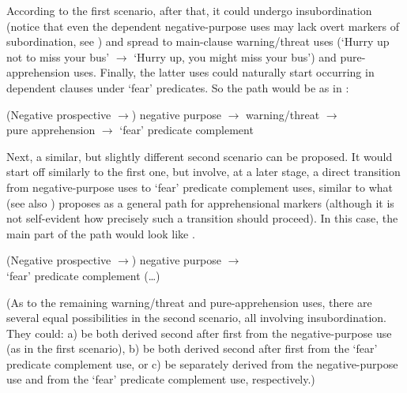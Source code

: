 \documentclass[output=paper,colorlinks,citecolor=brown]{langscibook}
\begin{document}
According to the first scenario, after that, it could undergo insubordination (notice that even the dependent negative-purpose uses may lack overt markers of subordination, see ) and spread to main-clause warning\slash threat uses (`Hurry up not to miss your bus' $\rightarrow$ `Hurry up, you might miss your bus') and pure\hyp apprehension uses. Finally, the latter uses could naturally start occurring in dependent clauses under `fear' predicates. So the path would be as in :

\ea\label{path1} \textnormal{(Negative prospective $\rightarrow$) negative purpose $\rightarrow$ warning\slash threat $\rightarrow$  \\
pure apprehension $\rightarrow$ `fear' predicate complement}
\z

 Next, a similar, but slightly different second scenario can be proposed. It would start off similarly to the first one, but involve, at a later stage, a direct transition from negative-purpose uses to `fear' predicate complement uses, similar to what \citet[319]{lichtenberk1995} (see also \cite[186--187]{Schmidtke-Bode2009}) proposes as a general path for apprehensional markers (although it is not self-evident how precisely such a transition should proceed). In this case, the main part of the path would look like .

\ea\label{path2} \textnormal{(Negative prospective $\rightarrow$) negative purpose $\rightarrow$ \\
`fear' predicate complement (\dots)}
\z

 (As to the remaining warning\slash threat and pure-apprehension uses, there are several equal possibilities in the second scenario, all involving insubordination. They could: a) be both derived second after first from the negative-purpose use (as in the first scenario), b) be both derived second after first from the `fear' predicate complement use, or c) be separately derived from the negative-purpose use and from the `fear' predicate complement use, respectively.)
\end{document}
